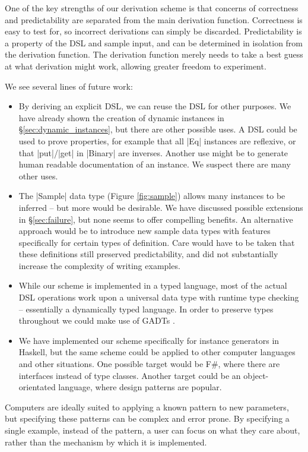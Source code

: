 \documentclass[preprint,draft]{sigplanconf}
\begin{document}
One of the key strengths of our derivation scheme is that concerns of correctness and predictability are separated from the main derivation function. Correctness is easy to test for, so incorrect derivations can simply be discarded. Predictability is a property of the DSL and sample input, and can be determined in isolation from the derivation function. The derivation function merely needs to take a best guess at what derivation might work, allowing greater freedom to experiment.

We see several lines of future work:

\begin{itemize}
\item By deriving an explicit DSL, we can reuse the DSL for other purposes. We have already shown the creation of dynamic instances in \S\ref{sec:dynamic_instances}, but there are other possible uses. A DSL could be used to prove properties, for example that all |Eq| instances are reflexive, or that |put|/|get| in |Binary| are inverses. Another use might be to generate human readable documentation of an instance. We suspect there are many other uses.
\item The |Sample| data type (Figure \ref{fig:sample}) allows many instances to be inferred -- but more would be desirable. We have discussed possible extensions in \S\ref{sec:failure}, but none seems to offer compelling benefits. An alternative approach would be to introduce new sample data types with features specifically for certain types of definition. Care would have to be taken that these definitions still preserved predictability, and did not substantially increase the complexity of writing examples.
\item While our scheme is implemented in a typed language, most of the actual DSL operations work upon a universal data type with runtime type checking -- essentially a dynamically typed language. In order to preserve types throughout we could make use of GADTs \cite{spj:gadt}.
\item We have implemented our scheme specifically for instance generators in Haskell, but the same scheme could be applied to other computer languages and other situations. One possible target would be F\#, where there are interfaces instead of type classes. Another target could be an object-orientated language, where design patterns \cite{design_patterns} are popular.
\end{itemize}

Computers are ideally suited to applying a known pattern to new parameters, but specifying these patterns can be complex and error prone. By specifying a single example, instead of the pattern, a user can focus on what they care about, rather than the mechanism by which it is implemented.
\end{document}
